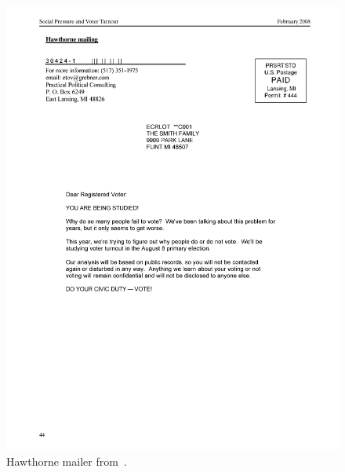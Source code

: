 \documentclass{article}
\begin{document}
\begin{figure}
\centering
\includegraphics[width=\textwidth]{figures/gerber_social_2008_hawthorne}
\caption{Hawthorne mailer from~\citet{gerber_social_2008}.}
\label{fig:gerber_social_2008_hawthorne}
\end{figure}
\end{document}
